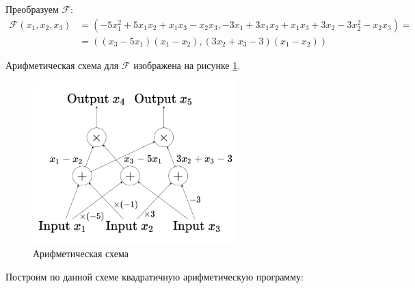 \documentclass[12pt, a4paper]{extarticle}
\begin{document}
Преобразуем $\mathcal{F}$:
\begin{equation*}
    \begin{split}
        \mathcal{F}(x_1, x_2, x_3) & = (-5x_1^2+5x_1x_2+x_1x_3 - x_2x_3, 
            -3x_1+3x_1x_2+x_1x_3+3x_2-3x_2^2-x_2x_3) = \\
        & = \left((x_3 - 5x_1)(x_1 - x_2), (3x_2 + x_3 - 3)(x_1 - x_2)\right)
    \end{split}
\end{equation*}

Арифметическая схема для $\mathcal{F}$ изображена на рисунке \ref{arithmetic-circuit}.

\begin{figure}[h]
    \centering
    \includegraphics[width=0.7\textwidth]{arithmetic-circuit-hw_7.png}
    \caption{Арифметическая схема}
    \label{arithmetic-circuit}
\end{figure}

Построим по данной схеме квадратичную арифметическую программу:
\end{document}
